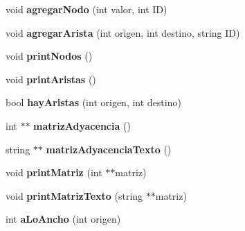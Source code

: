 \begin{DoxyCompactItemize}
void {\bfseries agregar\+Nodo} (int valor, int ID)
\item 
\mbox{\label{class_grafo_a43a0d5ad772e6eda6203aad0682ba7a7}} 
void {\bfseries agregar\+Arista} (int origen, int destino, string ID)
\item 
\mbox{\label{class_grafo_a49a0553b340fd2bf7902def48a2e80ce}} 
void {\bfseries print\+Nodos} ()
\item 
\mbox{\label{class_grafo_a4ff6a98b75185a29e46f135d2f426d9e}} 
void {\bfseries print\+Aristas} ()
\item 
\mbox{\label{class_grafo_a7e4e4d7841645b079d7c917a1ada8dd1}} 
bool {\bfseries hay\+Aristas} (int origen, int destino)
\item 
\mbox{\label{class_grafo_ab4c4d98d9eadd6a7c69c0cbcf0bbaa41}} 
int $\ast$$\ast$ {\bfseries matriz\+Adyacencia} ()
\item 
\mbox{\label{class_grafo_a1bd0141c8287ecef32e9d8cd360ddc52}} 
string $\ast$$\ast$ {\bfseries matriz\+Adyacencia\+Texto} ()
\item 
\mbox{\label{class_grafo_a1a2bae5ed701b47866ed740d093be38a}} 
void {\bfseries print\+Matriz} (int $\ast$$\ast$matriz)
\item 
\mbox{\label{class_grafo_ad5e0df300d3f4b83623f5787f6b7a2d3}} 
void {\bfseries print\+Matriz\+Texto} (string $\ast$$\ast$matriz)
\item 
\mbox{\label{class_grafo_aeeff5cd107c3423adbbf3a68818cf4ad}} 
int {\bfseries a\+Lo\+Ancho} (int origen)
\end{DoxyCompactItemize}
